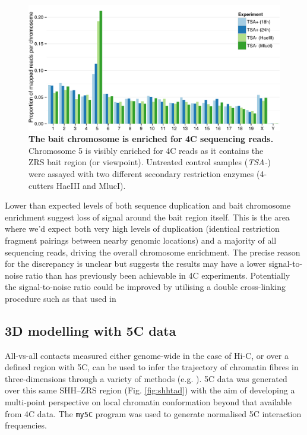 \documentclass[a4paper,11pt,oneside]{book}
\begin{document}
\begin{figure}
\begin{center} 
\includegraphics[width=5.4in]{figs/4c_chromosomes.pdf}
\captionsetup{width=\textwidth} 
\caption[ The bait chromosome is enriched for 4C sequencing reads. ]{ {\bf The bait chromosome is enriched for 4C sequencing reads. }
Chromosome 5 is visibly enriched for 4C reads as it  contains the ZRS bait region (or viewpoint). Untreated control samples (\emph{TSA-}) were assayed with two different secondary restriction enzymes (4-cutters HaeIII and MlucI).
}\label{fig:4cchromosomes}
\end{center} 
\end{figure} 

Lower than expected levels of both sequence duplication and bait chromosome enrichment suggest loss of signal around the bait region itself. This is the area where we'd expect both very high levels of duplication (identical restriction fragment pairings between nearby genomic locations) and a majority of all sequencing reads, driving the overall chromosome enrichment. The precise reason for the discrepancy is unclear but suggests the results may have a lower signal-to-noise ratio than has previously been achievable in 4C experiments.\cite{Stadhouders2013} Potentially the signal-to-noise ratio could be improved by utilising a double cross-linking procedure such as that used in \citet{Lin2012}

\subsection{3D modelling with 5C data}

All-vs-all contacts measured either genome-wide in the case of Hi-C, or over a defined region with 5C, can be used to infer the trajectory of chromatin fibres in three-dimensions through a variety of methods (e.g. \cite{Bau2011a, Hu2013a, Varoquaux2014a, Lesne2014, Trieu2014, Peng2013, Ay2014b, Caudai2015}). 5C data was generated over this same SHH--ZRS region (Fig. \ref{fig:shhtad}) with the aim of developing a multi-point perspective on local chromatin conformation beyond that available from 4C data. The \texttt{my5C} program was used to generate normalised 5C interaction frequencies.\cite{Lajoie2009a}
\end{document}

